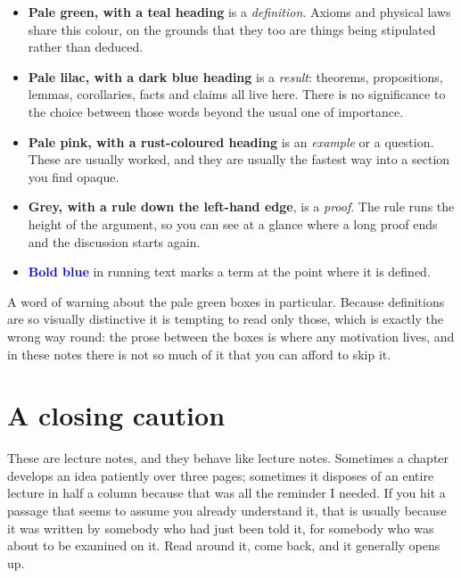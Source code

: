 \begin{itemize}
	\item \textcolor{definitionfg}{\textbf{Pale green, with a teal heading}} is a
	\emph{definition}. Axioms and physical laws share this colour, on the grounds that
	they too are things being stipulated rather than deduced.

	\item \textcolor{theoremfg}{\textbf{Pale lilac, with a dark blue heading}} is a
	\emph{result}: theorems, propositions, lemmas, corollaries, facts and claims all
	live here. There is no significance to the choice between those words beyond the
	usual one of importance.

	\item \textcolor{examplefg}{\textbf{Pale pink, with a rust-coloured heading}} is an
	\emph{example} or a question. These are usually worked, and they are usually the
	fastest way into a section you find opaque.

	\item \textbf{Grey, with a rule down the left-hand edge}, is a \emph{proof}. The rule
	runs the height of the argument, so you can see at a glance where a long proof ends
	and the discussion starts again.

	\item \textcolor{blue}{\textbf{Bold blue}} in running text marks a term at the point
	where it is defined.
\end{itemize}

A word of warning about the pale green boxes in particular. Because definitions are so
visually distinctive it is tempting to read only those, which is exactly the wrong way
round: the prose between the boxes is where any motivation lives, and in these notes
there is not so much of it that you can afford to skip it.

\section*{A closing caution}

These are lecture notes, and they behave like lecture notes. Sometimes a chapter
develops an idea patiently over three pages; sometimes it disposes of an entire lecture
in half a column because that was all the reminder I needed. If you hit a passage that
seems to assume you already understand it, that is usually because it was written by
somebody who had just been told it, for somebody who was about to be examined on it.
Read around it, come back, and it generally opens up.
